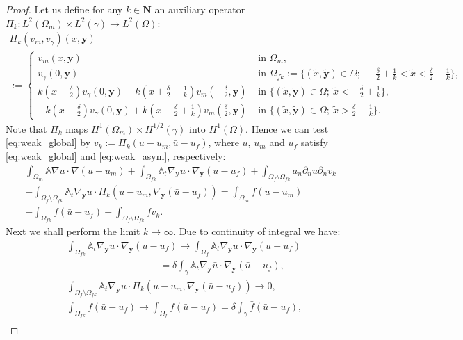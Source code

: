 \documentclass[a4paper]{article}
\def\vc#1{\mathbf{\boldsymbol{#1}}}     %
\def\tn#1{{\mathbb{#1}}}    %
\def\Natural{\mathbf N}
\def\yy{{\vc y}}
\begin{document}
\begin{proof}
Let us define for any $k\in\Natural$ an auxiliary operator $\Pi_k:L^2(\Omega_m)\times L^2(\gamma)\to L^2(\Omega)$:
\begin{multline*}
\Pi_k(v_m,v_\gamma)(x,\vc y)\\ :=
\begin{cases}
v_m(x,\vc y) & \mbox{ in }\Omega_m,\\
v_\gamma(0,\vc y) & \mbox{ in }\Omega_{fk}:=\{(\tilde x,\tilde{\vc y})\in\Omega;~-\frac\delta2+\frac1k<\tilde x<\frac\delta2-\frac1k\},\\
k(x+\frac\delta2)v_\gamma(0,\vc y) - k(x+\frac\delta2-\frac1k)v_m(-\frac\delta2,\vc y) & \mbox{ in }\{(\tilde x,\tilde{\vc y})\in\Omega;~\tilde x<-\frac\delta2+\frac1k\},\\
-k(x-\frac\delta2)v_\gamma(0,\vc y) + k(x-\frac\delta2+\frac1k)v_m(\frac\delta2,\vc y) & \mbox{ in }\{(\tilde x,\tilde{\vc y})\in\Omega;~\tilde x>\frac\delta2-\frac1k\}.
\end{cases}
\end{multline*}
Note that $\Pi_k$ maps $H^1(\Omega_m)\times H^{1/2}(\gamma)$ into $H^1(\Omega)$.
Hence we can test \eqref{eq:weak_global} by $v_k:=\Pi_k(u-u_m,\bar u-u_f)$, where $u$, $u_m$ and $u_f$ satisfy \eqref{eq:weak_global} and \eqref{eq:weak_asym}, respectively:
\begin{multline}
\label{eq:global_vk}
\int_{\Omega_m}\tn A\nabla u\cdot\nabla(u-u_m)
+\int_{\Omega_{fk}}\tn A_t\nabla_\yy u\cdot\nabla_\yy(\bar u-u_f)
+\int_{\Omega_f\setminus\Omega_{fk}} a_n\partial_n u \partial_n v_k\\
+ \int_{\Omega_f\setminus\Omega_{fk}} \tn A_t\nabla_\yy u \cdot \Pi_k(u-u_m,\nabla_\yy(\bar u-u_f))
= \int_{\Omega_m} f (u-u_m)\\
+ \int_{\Omega_{fk}} f (\bar u-u_f)
+ \int_{\Omega_f\setminus\Omega_{fk}} f v_k.
\end{multline}
Next we shall perform the limit $k\to\infty$.
Due to continuity of integral we have:
\begin{align}
&\int_{\Omega_{fk}}\tn A_t\nabla_\yy u\cdot\nabla_\yy(\bar u-u_f) \to \int_{\Omega_f}\tn A_t\nabla_\yy u\cdot\nabla_\yy(\bar u-u_f)\\
&\hspace{4cm} = \delta\int_\gamma\tn A_t\nabla_\yy\bar u\cdot\nabla_\yy(\bar u-u_f),\\
&\int_{\Omega_f\setminus\Omega_{fk}} \tn A_t\nabla_\yy u \cdot \Pi_k(u-u_m,\nabla_\yy(\bar u-u_f)) \to 0, \\
&\int_{\Omega_{fk}} f (\bar u-u_f) \to \int_{\Omega_{f}} f (\bar u-u_f) = \delta\int_{\gamma} \bar f (\bar u-u_f), \\

\end{align}
\end{proof}
\end{document}
